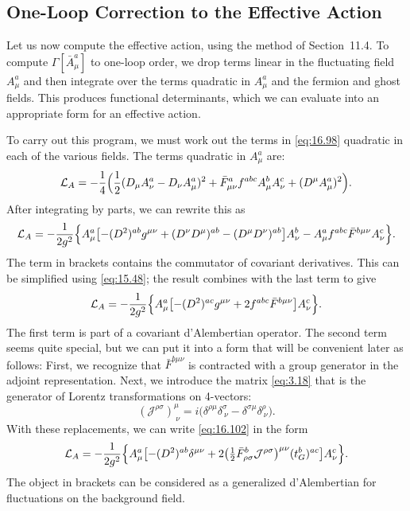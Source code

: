 \subsection{One-Loop Correction to the Effective Action}

Let us now compute the effective action, using the method of Section~11.4.
To compute $\Gamma[\bar{A}^a_\mu]$ to one-loop order, we drop terms linear in
the fluctuating field $A^a_\mu$ and then integrate over the terms quadratic in
$A^a_\mu$ and the fermion and ghost fields.  This produces functional
determinants, which we can evaluate into an appropriate form for an effective
action.

To carry out this program, we must work out the terms in \eqref{eq:16.98}
quadratic in each of the various fields.  The terms quadratic in $A^a_\mu$
are:
\begin{equation}
  \mathcal{L}_A = -\frac{1}{4}\Bigl( \frac{1}{2}(D_\mu A^a_\nu - D_\nu
    A^a_\mu)^2 + \bar{F}^a_{\mu\nu}f^{abc}A^b_\mu A^c_\nu + (D^\mu A^a_\mu)^2
    \Bigr) .
  \label{eq:16.100}
\end{equation}
After integrating by parts, we can rewrite this as
\begin{equation}
  \mathcal{L}_A = -\frac{1}{2g^2}\Bigl\{ A^a_\mu\bigl[ -(D^2)^{ab}g^{\mu\nu}
    + (D^\nu D^\mu)^{ab} - (D^\mu D^\nu)^{ab} \bigr]A^b_\nu
    - A^a_\mu f^{abc}\bar{F}^{b\mu\nu}A^c_\nu \Bigr\} .
  \label{eq:16.101}
\end{equation}
The term in brackets contains the commutator of covariant derivatives.  This
can be simplified using \eqref{eq:15.48}; the result combines with the last
term to give
\begin{equation}
  \mathcal{L}_A = -\frac{1}{2g^2}\Bigl\{ A^a_\mu\bigl[ -(D^2)^{ac}g^{\mu\nu}
    + 2f^{abc}\bar{F}^{b\mu\nu} \bigr]A^c_\nu \Bigr\} .
  \label{eq:16.102}
\end{equation}
The first term is part of a covariant d'Alembertian operator.  The second
term seems quite special, but we can put it into a form that will be
convenient later as follows: First, we recognize that $\bar{F}^{b\mu\nu}$ is
contracted with a group generator in the adjoint representation.  Next, we
introduce the matrix \eqref{eq:3.18} that is the generator of Lorentz
transformations on 4-vectors:
\begin{equation}
  (\mathcal{J}^{\rho\sigma})^\mu_{\ \nu} = i\bigl( \delta^{\rho\mu}
    \delta^{\sigma}_{\ \nu} - \delta^{\sigma\mu}\delta^{\rho}_{\ \nu}
    \bigr) .
  \label{eq:16.103}
\end{equation}
With these replacements, we can write \eqref{eq:16.102} in the form
\begin{equation}
  \mathcal{L}_A = -\frac{1}{2g^2}\Bigl\{ A^a_\mu\bigl[ -(D^2)^{ab}
    \delta^{\mu\nu} + 2\bigl( \tfrac{1}{2}\bar{F}^{b}_{\rho\sigma}
      \mathcal{J}^{\rho\sigma} \bigr)^{\mu\nu}(t^b_G)^{ac} \bigr]A^c_\nu
    \Bigr\} .
  \label{eq:16.104}
\end{equation}
The object in brackets can be considered as a generalized d'Alembertian for
fluctuations on the background field.


